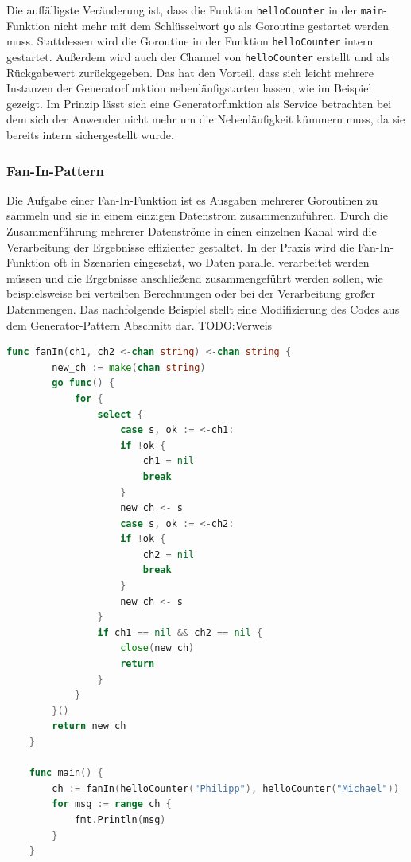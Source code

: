 \documentclass[fontsize=12pt,paper=a4,twoside=semi,parskip=half-,headsepline,headinclude]{scrreprt}
\begin{document}
Die auffälligste Veränderung ist, dass die Funktion \texttt{helloCounter} in der \texttt{main}-Funktion nicht mehr mit dem Schlüsselwort \texttt{go} als Goroutine gestartet werden muss. Stattdessen wird die Goroutine in der Funktion \texttt{helloCounter} intern gestartet. Außerdem wird auch der Channel von \texttt{helloCounter} erstellt und als Rückgabewert zurückgegeben. Das hat den Vorteil, dass sich leicht mehrere Instanzen der Generatorfunktion nebenläufigstarten lassen, wie im Beispiel gezeigt. Im Prinzip lässt sich eine Generatorfunktion als Service betrachten bei dem sich der Anwender nicht mehr um die Nebenläufigkeit kümmern muss, da sie bereits intern sichergestellt wurde.

\subsubsection{Fan-In-Pattern}

Die Aufgabe einer Fan-In-Funktion ist es Ausgaben mehrerer Goroutinen zu sammeln und sie in einem einzigen Datenstrom zusammenzuführen. Durch die Zusammenführung mehrerer Datenströme in einen einzelnen Kanal wird die Verarbeitung der Ergebnisse effizienter gestaltet. In der Praxis wird die Fan-In-Funktion oft in Szenarien eingesetzt, wo Daten parallel verarbeitet werden müssen und die Ergebnisse anschließend zusammengeführt werden sollen, wie beispielsweise bei verteilten Berechnungen oder bei der Verarbeitung großer Datenmengen. Das nachfolgende Beispiel stellt eine Modifizierung des Codes aus dem Generator-Pattern Abschnitt dar. TODO:Verweis

\begin{lstlisting}[language=Go,extendedchars=true]
	func fanIn(ch1, ch2 <-chan string) <-chan string {
		new_ch := make(chan string)
		go func() {
			for {
				select {
					case s, ok := <-ch1:
					if !ok {
						ch1 = nil
						break
					}
					new_ch <- s
					case s, ok := <-ch2:
					if !ok {
						ch2 = nil
						break
					}
					new_ch <- s
				}
				if ch1 == nil && ch2 == nil {
					close(new_ch)
					return
				}
			}
		}()
		return new_ch
	}

	func main() {
		ch := fanIn(helloCounter("Philipp"), helloCounter("Michael"))
		for msg := range ch {
			fmt.Println(msg)
		}
	}
\end{lstlisting}
\end{document}
